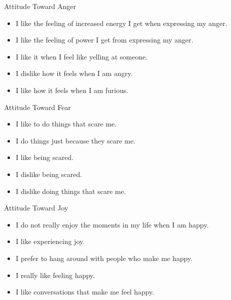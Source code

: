 Attitude Toward Anger
\begin{itemize}
  \item I like the feeling of increased energy I get when expressing my anger.
  \item I like the feeling of power I get from expressing my anger.
  \item I like it when I feel like yelling at someone.
  \item I dislike how it feels when I am angry.
  \item I like how it feels when I am furious.
\end{itemize}

Attitude Toward Fear
\begin{itemize}
  \item I like to do things that scare me.
  \item I do things just because they scare me.
  \item I like being scared.
  \item I dislike being scared.
  \item I dislike doing things that scare me.
\end{itemize}

Attitude Toward Joy
\begin{itemize}
  \item I do not really enjoy the moments in my life when I am happy.
  \item I like experiencing joy.
  \item I prefer to hang around with people who make me happy.
  \item I really like feeling happy.
  \item I like conversations that make me feel happy.
\end{itemize}


